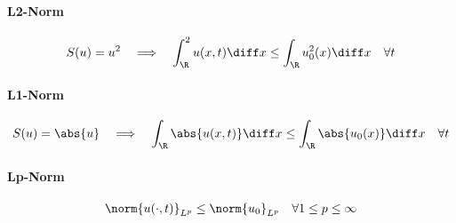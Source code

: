 \paragraph{L2-Norm}
\begin{propertybox}\nospacing
    \begin{property}[L2-Norm]\label{property:l2-norm_entropy_solution}
       \begin{align}
         S(u)=u^{2}&&\implies&&
         \int_{\R}^{2}u(x,t)\diff x\leq
                 \int_{\R}u_{0}^{2}(x)\diff x&&\forall t
       \end{align}
    \end{property}
\end{propertybox}
\paragraph{L1-Norm}
\begin{propertybox}\nospacing
    \begin{property}[L1-Norm]\label{property:l1-norm_entropy_solution}
       \begin{align}
         S(u)=\abs{u}&&\implies&&
         \int_{\R}\abs{u(x,t)}\diff x\leq
                 \int_{\R}\abs{u_{0}(x)}\diff x&&\forall t
       \end{align}
    \end{property}
\end{propertybox}
\paragraph{Lp-Norm}
\begin{propertybox}\nospacing
    \begin{property}[L1-Norm]\label{property:l1-norm_entropy_solution}
       \begin{align}
         \norm{u(\cdot,t)}_{L^{p}}\leq\norm{u_{0}}_{L^{p}}&&\forall1\leq p\leq\infty
       \end{align}
    \end{property}
\end{propertybox}
